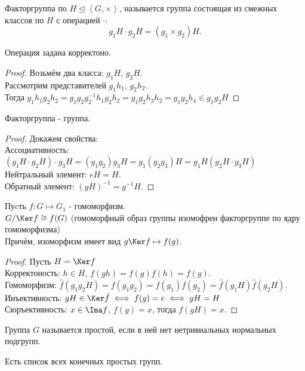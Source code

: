 \documentclass[11pt, oneside]{article}   	%
\begin{document}
    \begin{definition}
        Факторгруппа по $H \unlhd \left<G, \times\right>$, называется группа состоящая из смежных классов по $H$ с операцией $\cdot $:
        \[ g_1H\cdot g_2H = (g_1 \times g_2)H .\] 
    \end{definition}
    \begin{dlemma}
        Операция задана корректоно.
        \begin{proof}
            Возьмём два класса: $g_1H$, $g_2H$.\\
            Рассмотрим представителей $g_1h_1$, $g_2h_2$.\\
            Тогда $g_1h_1g_2h_2 = g_1g_2g_2^{-1}h_1g_2h_2 = g_1g_2h_3h_2 = g_1g_2h_4\in g_1g_2H$
        \end{proof}
    \end{dlemma}
    \begin{dlemma}
        Факторгруппа - группа.
        \begin{proof} Докажем свойства:\\
            Ассоциативность: $(g_1H\cdot g_2H)\cdot g_3H = (g_1g_2)g_3H = g_1(g_2g_3)H = g_1H(g_2H\cdot g_3H)$
            Нейтральный элемент: $eH = H$.\\
            Обратный элемент: $(gH)^{-1} = g^{-1}H$.
        \end{proof}
    \end{dlemma}
    \begin{theorem}
        Пуcть $f: G \mapsto G_1$ - гомоморфизм.\\
        $G/\Ker f \cong f(G)$ (гомоморфный образ группы изомофрен факторгруппе по ядру гомоморфизма)\\
        Причём, изоморфизм имеет вид $g\Ker f \mapsto f(g)$.\\
        \begin{proof}
            Пусть $H=\Ker f$\\
            Корректоность: $h\in H$, $f(gh) = f(g)f(h) = f(g)$.\\
            Гомоморфизм: $\hat{f}(g_1g_2H) = f(g_1g_2) = f(g_1)f(g_2) = \hat{f}(g_1H)\hat{f}(g_2H)$.\\
            Инъективность: $gH\in \Ker \hat{f} \iff f(g) = e \iff gH = H$\\
            Сюръективность: $x\in \Ima f$, $f(g) = x$, тогда $f(gH) = x$.
        \end{proof}
    \end{theorem}
    \begin{definition}
        Группа $G$ называется простой, если в ней нет нетривиальных нормальных подгрупп.
    \end{definition}
    \begin{theorem}
        Есть список всех конечных простых групп.
    \end{theorem}
\end{document}
